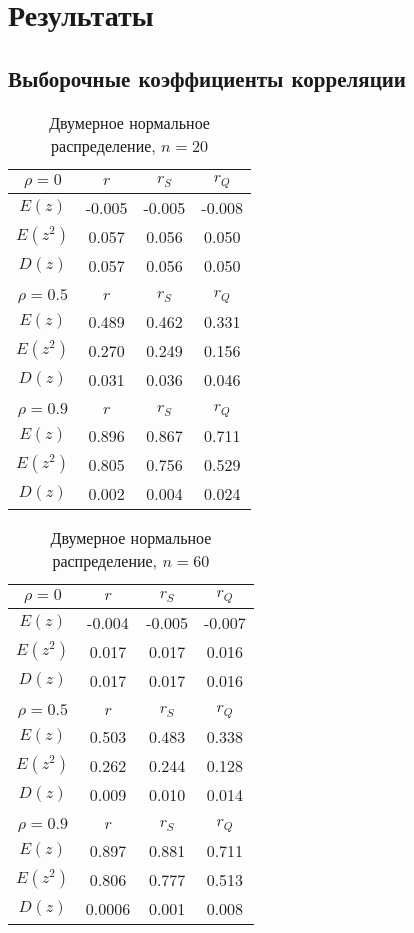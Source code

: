 \section{Результаты}
\subsection{Выборочные коэффициенты корреляции}
\newpage
\begin{table}[h]
	\centering
		\begin{tabular} {|c|c|c|c|}
			\hline
			$\rho=0$ & $r$ & $r_S$ & $r_Q$ \\ \hline
			$E(z)$ & -0.005 & -0.005 & -0.008 \\ \hline
			$E(z^2)$ & 0.057 & 0.056 & 0.050 \\ \hline
			$D(z)$ & 0.057 & 0.056 & 0.050 \\ \hline
			&&&\\ \hline
			$\rho=0.5$ & $r$ & $r_S$ & $r_Q$ \\ \hline
			$E(z)$ & 0.489 & 0.462 & 0.331 \\ \hline
			$E(z^2)$ & 0.270 & 0.249 & 0.156 \\ \hline
			$D(z)$ & 0.031 & 0.036 & 0.046 \\ \hline
			&&&\\ \hline
			$\rho=0.9$ & $r$ & $r_S$ & $r_Q$ \\ \hline
			$E(z)$ & 0.896 & 0.867 & 0.711 \\ \hline
			$E(z^2)$ & 0.805 & 0.756 & 0.529 \\ \hline
			$D(z)$ & 0.002 & 0.004 & 0.024 \\ \hline
		\end{tabular}
	\caption{Двумерное нормальное распределение, $n=20$}
\end{table}

\begin{table}[h]
	\centering
		\begin{tabular} {|c|c|c|c|}
			\hline
			$\rho=0$ & $r$ & $r_S$ & $r_Q$ \\ \hline
			$E(z)$ & -0.004 & -0.005 & -0.007 \\ \hline
			$E(z^2)$ & 0.017 & 0.017 & 0.016 \\ \hline
			$D(z)$ & 0.017 & 0.017 & 0.016 \\ \hline
			&&&\\ \hline
			$\rho=0.5$ & $r$ & $r_S$ & $r_Q$ \\ \hline
			$E(z)$ & 0.503 & 0.483 & 0.338 \\ \hline
			$E(z^2)$ & 0.262 & 0.244 & 0.128 \\ \hline
			$D(z)$ & 0.009 & 0.010 & 0.014 \\ \hline
			&&&\\ \hline
			$\rho=0.9$ & $r$ & $r_S$ & $r_Q$ \\ \hline
			$E(z)$ & 0.897 & 0.881 & 0.711 \\ \hline
			$E(z^2)$ & 0.806 & 0.777 & 0.513 \\ \hline
			$D(z)$ & 0.0006 & 0.001 & 0.008 \\ \hline
		\end{tabular}
	\caption{Двумерное нормальное распределение, $n=60$}
\end{table}

